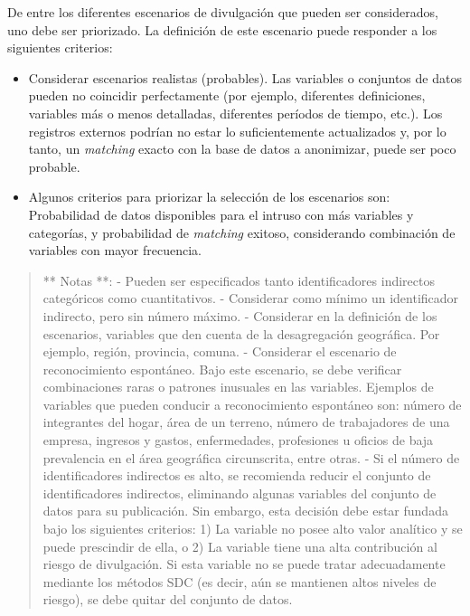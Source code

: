 \documentclass[]{book}
\providecommand{\tightlist}{%
  \setlength{\itemsep}{0pt}\setlength{\parskip}{0pt}}
\theoremstyle{definition}
\theoremstyle{definition}
\theoremstyle{definition}
\theoremstyle{definition}
\theoremstyle{remark}
\begin{document}
De entre los diferentes escenarios de divulgación que pueden ser considerados, uno debe ser priorizado. La definición de este escenario puede responder a los siguientes criterios:

\begin{itemize}
\tightlist
\item
  Considerar escenarios realistas (probables). Las variables o conjuntos de datos pueden no coincidir perfectamente (por ejemplo, diferentes definiciones, variables más o menos detalladas, diferentes períodos de tiempo, etc.). Los registros externos podrían no estar lo suficientemente actualizados y, por lo tanto, un \emph{matching} exacto con la base de datos a anonimizar, puede ser poco probable.
\item
  Algunos criterios para priorizar la selección de los escenarios son: Probabilidad de datos disponibles para el intruso con más variables y categorías, y probabilidad de \emph{matching} exitoso, considerando combinación de variables con mayor frecuencia.
\end{itemize}

\begin{quote}
** Notas **:
- Pueden ser especificados tanto identificadores indirectos categóricos como cuantitativos. - Considerar como mínimo un identificador indirecto, pero sin número máximo.
- Considerar en la definición de los escenarios, variables que den cuenta de la desagregación geográfica. Por ejemplo, región, provincia, comuna.
- Considerar el escenario de reconocimiento espontáneo. Bajo este escenario, se debe verificar combinaciones raras o patrones inusuales en las variables. Ejemplos de variables que pueden conducir a reconocimiento espontáneo son: número de integrantes del hogar, área de un terreno, número de trabajadores de una empresa, ingresos y gastos, enfermedades, profesiones u oficios de baja prevalencia en el área geográfica circunscrita, entre otras.
- Si el número de identificadores indirectos es alto, se recomienda reducir el conjunto de identificadores indirectos, eliminando algunas variables del conjunto de datos para su publicación. Sin embargo, esta decisión debe estar fundada bajo los siguientes criterios: 1) La variable no posee alto valor analítico y se puede prescindir de ella, o 2) La variable tiene una alta contribución al riesgo de divulgación. Si esta variable no se puede tratar adecuadamente mediante los métodos SDC (es decir, aún se mantienen altos niveles de riesgo), se debe quitar del conjunto de datos.
\end{quote}
\end{document}
